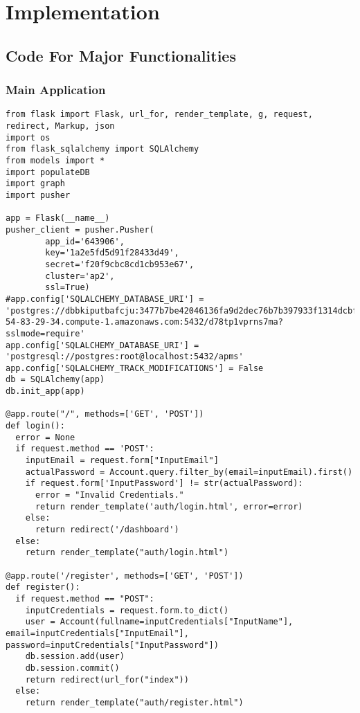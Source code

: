 \chapter{Implementation}

\section{Code For Major Functionalities}
\subsection{Main Application}
\thispagestyle{fancy}
\begin{verbatim}
from flask import Flask, url_for, render_template, g, request, redirect, Markup, json
import os
from flask_sqlalchemy import SQLAlchemy
from models import *
import populateDB
import graph
import pusher

app = Flask(__name__)
pusher_client = pusher.Pusher(
        app_id='643906',
        key='1a2e5fd5d91f28433d49',
        secret='f20f9cbc8cd1cb953e67',
        cluster='ap2',
        ssl=True)
#app.config['SQLALCHEMY_DATABASE_URI'] = 'postgres://dbbkiputbafcju:3477b7be42046136fa9d2dec76b7b397933f1314dcbf136a64e1d1288185663a@ec2-54-83-29-34.compute-1.amazonaws.com:5432/d78tp1vprns7ma?sslmode=require'
app.config['SQLALCHEMY_DATABASE_URI'] = 'postgresql://postgres:root@localhost:5432/apms'
app.config['SQLALCHEMY_TRACK_MODIFICATIONS'] = False
db = SQLAlchemy(app)
db.init_app(app)

@app.route("/", methods=['GET', 'POST'])
def login():
  error = None
  if request.method == 'POST':
    inputEmail = request.form["InputEmail"]
    actualPassword = Account.query.filter_by(email=inputEmail).first()
    if request.form['InputPassword'] != str(actualPassword):
      error = "Invalid Credentials."
      return render_template('auth/login.html', error=error)
    else:
      return redirect('/dashboard')
  else:
    return render_template("auth/login.html")

@app.route('/register', methods=['GET', 'POST'])
def register():
  if request.method == "POST":
    inputCredentials = request.form.to_dict()
    user = Account(fullname=inputCredentials["InputName"], email=inputCredentials["InputEmail"], password=inputCredentials["InputPassword"])
    db.session.add(user)
    db.session.commit()
    return redirect(url_for("index"))
  else:
    return render_template("auth/register.html")


\end{verbatim}
